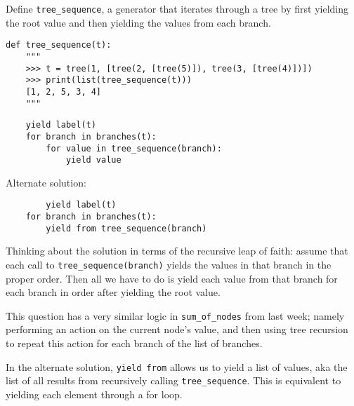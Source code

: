 \begin{blocksection}
\question Define \lstinline$tree_sequence$, a generator that iterates through a tree by first yielding the root value and then yielding the values from each branch.

\begin{lstlisting}
def tree_sequence(t):
    """
    >>> t = tree(1, [tree(2, [tree(5)]), tree(3, [tree(4)])])
    >>> print(list(tree_sequence(t)))
    [1, 2, 5, 3, 4]
    """
\end{lstlisting}

\begin{solution}[1.5in]
\begin{lstlisting}
	yield label(t)
	for branch in branches(t):
		for value in tree_sequence(branch):
			yield value
\end{lstlisting}
Alternate solution:
\begin{lstlisting}
        yield label(t)
	for branch in branches(t):
		yield from tree_sequence(branch)
\end{lstlisting}
Thinking about the solution in terms of the recursive leap of faith: assume that each call to \lstinline{tree_sequence(branch)} yields the values in that branch in the proper order. Then all we have to do is yield each value from that branch for each branch in order after yielding the root value. 

This question has a very similar logic in \lstinline{sum_of_nodes} from last week; namely performing an action on the current node’s value, and then using tree recursion to repeat this action for each branch of the list of branches.

In the alternate solution, \lstinline{yield from} allows us to yield a list of values, aka the list of all results from recursively calling \lstinline{tree_sequence}. This is equivalent to yielding each element through a for loop.
\end{solution}


\end{blocksection}
